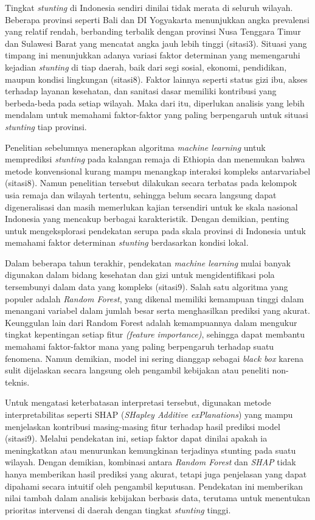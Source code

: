 Tingkat \textit{stunting} di Indonesia sendiri dinilai tidak merata di seluruh wilayah. Beberapa provinsi seperti Bali dan DI Yogyakarta menunjukkan angka prevalensi yang relatif rendah, berbanding terbalik dengan provinsi Nusa Tenggara Timur dan Sulawesi Barat yang mencatat angka jauh lebih tinggi (sitasi3). Situasi yang timpang ini menunjukkan adanya variasi faktor determinan yang memengaruhi kejadian \textit{stunting} di tiap daerah, baik dari segi sosial, ekonomi, pendidikan, maupun kondisi lingkungan (sitasi8). Faktor lainnya seperti status gizi ibu, akses terhadap layanan kesehatan, dan sanitasi dasar memiliki kontribusi yang berbeda-beda pada setiap wilayah. Maka dari itu, diperlukan analisis yang lebih mendalam untuk memahami faktor-faktor yang paling berpengaruh untuk situasi \textit{stunting} tiap provinsi.

Penelitian sebelumnya menerapkan algoritma \textit{machine learning} untuk memprediksi \textit{stunting} pada kalangan remaja di Ethiopia dan menemukan bahwa metode konvensional kurang mampu menangkap interaksi kompleks antarvariabel (sitasi8). Namun penelitian tersebut dilakukan secara terbatas pada kelompok usia remaja dan wilayah tertentu, sehingga belum secara langsung dapat digeneralisasi dan masih memerlukan kajian tersendiri untuk ke skala nasional Indonesia yang mencakup berbagai karakteristik. Dengan demikian, penting untuk mengeksplorasi pendekatan serupa pada skala provinsi di Indonesia untuk memahami faktor determinan \textit{stunting} berdasarkan kondisi lokal.

Dalam beberapa tahun terakhir, pendekatan \textit{machine learning} mulai banyak digunakan dalam bidang kesehatan dan gizi untuk mengidentifikasi pola tersembunyi dalam data yang kompleks (sitasi9). Salah satu algoritma yang populer adalah \textit{Random Forest}, yang dikenal memiliki kemampuan tinggi dalam menangani variabel dalam jumlah besar serta menghasilkan prediksi yang akurat. Keunggulan lain dari Random Forest adalah kemampuannya dalam mengukur tingkat kepentingan setiap fitur \textit{(feature importance)}, sehingga dapat membantu memahami faktor-faktor mana yang paling berpengaruh terhadap suatu fenomena. Namun demikian, model ini sering dianggap sebagai \textit{black box} karena sulit dijelaskan secara langsung oleh pengambil kebijakan atau peneliti non-teknis.

Untuk mengatasi keterbatasan interpretasi tersebut, digunakan metode interpretabilitas seperti SHAP (\textit{SHapley Additive exPlanations}) yang mampu menjelaskan kontribusi masing-masing fitur terhadap hasil prediksi model (sitasi9). Melalui pendekatan ini, setiap faktor dapat dinilai apakah ia meningkatkan atau menurunkan kemungkinan terjadinya stunting pada suatu wilayah. Dengan demikian, kombinasi antara \textit{Random Forest} dan \textit{SHAP} tidak hanya memberikan hasil prediksi yang akurat, tetapi juga penjelasan yang dapat dipahami secara intuitif oleh pengambil keputusan. Pendekatan ini memberikan nilai tambah dalam analisis kebijakan berbasis data, terutama untuk menentukan prioritas intervensi di daerah dengan tingkat \textit{stunting} tinggi.

